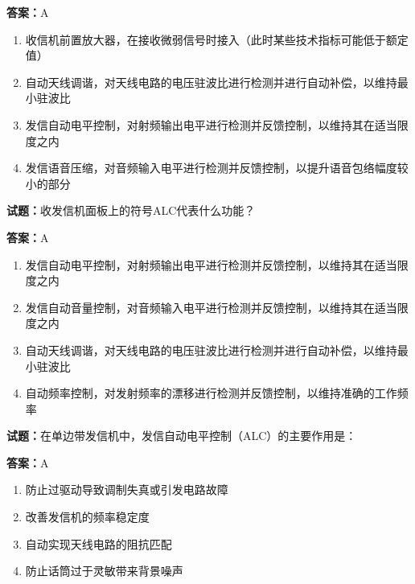 \documentclass{ctexbook}
\begin{document}
\textbf{答案：}A 

\begin{enumerate}[leftmargin=3em]
  \item 收信机前置放大器，在接收微弱信号时接入（此时某些技术指标可能低于额定值） 

  \item 自动天线调谐，对天线电路的电压驻波比进行检测并进行自动补偿，以维持最小驻波比 

  \item 发信自动电平控制，对射频输出电平进行检测并反馈控制，以维持其在适当限度之内 

  \item 发信语音压缩，对音频输入电平进行检测并反馈控制，以提升语音包络幅度较小的部分 

\end{enumerate}





\vspace{1em}

\textbf{试题：}收发信机面板上的符号ALC代表什么功能？ 

\textbf{答案：}A 

\begin{enumerate}[leftmargin=3em]
  \item 发信自动电平控制，对射频输出电平进行检测并反馈控制，以维持其在适当限度之内 

  \item 发信自动音量控制，对音频输入电平进行检测并反馈控制，以维持其在适当限度之内 

  \item 自动天线调谐，对天线电路的电压驻波比进行检测并进行自动补偿，以维持最小驻波比 

  \item 自动频率控制，对发射频率的漂移进行检测并反馈控制，以维持准确的工作频率 

\end{enumerate}





\vspace{1em}

\textbf{试题：}在单边带发信机中，发信自动电平控制（ALC）的主要作用是： 

\textbf{答案：}A 

\begin{enumerate}[leftmargin=3em]
  \item 防止过驱动导致调制失真或引发电路故障 

  \item 改善发信机的频率稳定度 


  \item 自动实现天线电路的阻抗匹配 

  \item 防止话筒过于灵敏带来背景噪声 

\end{enumerate}
\end{document}
